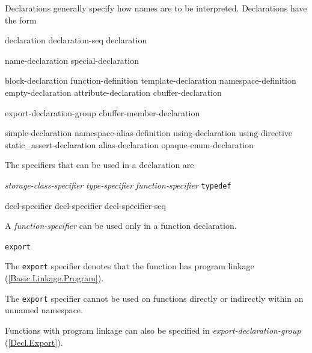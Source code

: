 \p Declarations generally specify how names are to be interpreted. Declarations have the form
\begin{grammar}
  \br
  declaration\br
  declaration-seq declaration\br

  \br
  name-declaration\br
  special-declaration\br

  \br
  block-declaration\br
  function-definition\br
  template-declaration\br
  namespace-definition\br
  empty-declaration\br
  attribute-declaration\br
  cbuffer-declaration\br

  \br
  export-declaration-group\br
  cbuffer-member-declaration\br

  \br
  simple-declaration\br
  namespace-alias-definition\br
  using-declaration\br
  using-directive\br
  static\_assert-declaration\br
  alias-declaration\br
  opaque-enum-declaration\br

  \br
  \terminal{;}

\end{grammar}

\p The specifiers that can be used in a declaration are
\begin{grammar}
  \br
  \textit{storage-class-specifier}\br
  \textit{type-specifier}\br
  \textit{function-specifier}\br
  \texttt{typedef}\br

  \br
  decl-specifier\br
  decl-specifier decl-specifier-seq\br
\end{grammar}


\p A \textit{function-specifier} can be used only in a function declaration.

\begin{grammar}
  \br
  \texttt{export}\br
\end{grammar}

\p The \texttt{export} specifier denotes that the function has program linkage (\ref{Basic.Linkage.Program}).

\p The \texttt{export} specifier cannot be used on functions directly or indirectly within an unnamed namespace.

\p Functions with program linkage can also be specified in \textit{export-declaration-group} (\ref{Decl.Export}).

